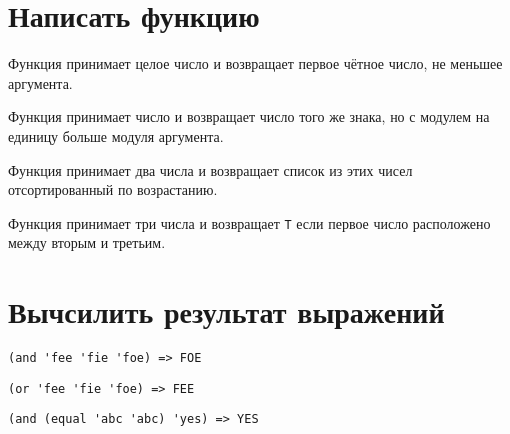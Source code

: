 
\section{Написать функцию}

\problem Функция принимает целое число и возвращает первое чётное число, не меньшее аргумента.



\problem Функция принимает число и возвращает число того же знака, но с модулем на единицу больше модуля аргумента.



\problem Функция принимает два числа и возвращает список из этих чисел отсортированный по возрастанию.



\problem Функция принимает три числа и возвращает \verb|T| если первое число расположено между вторым и третьим.




\section{Вычсилить результат выражений}

\problem \hfill
\begin{lstlisting}
(and 'fee 'fie 'foe) => FOE
\end{lstlisting}


\problem \hfill
\begin{lstlisting}
(or 'fee 'fie 'foe) => FEE
\end{lstlisting}


\problem \hfill
\begin{lstlisting}
(and (equal 'abc 'abc) 'yes) => YES
\end{lstlisting}